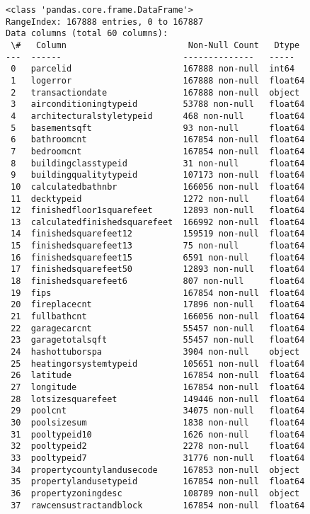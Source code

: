 \documentclass[11pt]{article}
\begin{document}
    \begin{Verbatim}[commandchars=\\\{\}]
<class 'pandas.core.frame.DataFrame'>
RangeIndex: 167888 entries, 0 to 167887
Data columns (total 60 columns):
 \#   Column                        Non-Null Count   Dtype
---  ------                        --------------   -----
 0   parcelid                      167888 non-null  int64
 1   logerror                      167888 non-null  float64
 2   transactiondate               167888 non-null  object
 3   airconditioningtypeid         53788 non-null   float64
 4   architecturalstyletypeid      468 non-null     float64
 5   basementsqft                  93 non-null      float64
 6   bathroomcnt                   167854 non-null  float64
 7   bedroomcnt                    167854 non-null  float64
 8   buildingclasstypeid           31 non-null      float64
 9   buildingqualitytypeid         107173 non-null  float64
 10  calculatedbathnbr             166056 non-null  float64
 11  decktypeid                    1272 non-null    float64
 12  finishedfloor1squarefeet      12893 non-null   float64
 13  calculatedfinishedsquarefeet  166992 non-null  float64
 14  finishedsquarefeet12          159519 non-null  float64
 15  finishedsquarefeet13          75 non-null      float64
 16  finishedsquarefeet15          6591 non-null    float64
 17  finishedsquarefeet50          12893 non-null   float64
 18  finishedsquarefeet6           807 non-null     float64
 19  fips                          167854 non-null  float64
 20  fireplacecnt                  17896 non-null   float64
 21  fullbathcnt                   166056 non-null  float64
 22  garagecarcnt                  55457 non-null   float64
 23  garagetotalsqft               55457 non-null   float64
 24  hashottuborspa                3904 non-null    object
 25  heatingorsystemtypeid         105651 non-null  float64
 26  latitude                      167854 non-null  float64
 27  longitude                     167854 non-null  float64
 28  lotsizesquarefeet             149446 non-null  float64
 29  poolcnt                       34075 non-null   float64
 30  poolsizesum                   1838 non-null    float64
 31  pooltypeid10                  1626 non-null    float64
 32  pooltypeid2                   2278 non-null    float64
 33  pooltypeid7                   31776 non-null   float64
 34  propertycountylandusecode     167853 non-null  object
 35  propertylandusetypeid         167854 non-null  float64
 36  propertyzoningdesc            108789 non-null  object
 37  rawcensustractandblock        167854 non-null  float64

\end{Verbatim}
\end{document}

